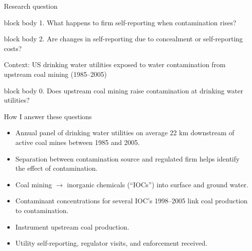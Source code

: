 \documentclass{beamer}
\begin{document}
\begin{frame}{Research question}

\begin{center}
\begin{beamercolorbox}[sep=10pt,center,rounded=true,shadow=true]{block body}
\large 1. What happens to firm self-reporting when contamination rises?
\end{beamercolorbox}
\end{center}

\begin{center}
\begin{beamercolorbox}[sep=10pt,center,rounded=true,shadow=true]{block body}
 2. Are changes in self-reporting due to concealment or self-reporting costs?
\end{beamercolorbox}
\end{center}

Context: US drinking water utilities exposed to water contamination from upstream coal mining (1985--2005)

\begin{center}
\begin{beamercolorbox}[sep=10pt,center,rounded=true,shadow=true]{block body}
 0. Does upstream coal mining raise contamination at drinking water utilities?
\end{beamercolorbox}
\end{center}

\end{frame}

\begin{frame}{How I answer these questions}

    \begin{itemize}
        \item Annual panel of drinking water utilities on average 22 km downstream of active coal mines between 1985 and 2005.
        \item Separation between contamination source and regulated firm helps identify the effect of contamination.

        \item Coal mining $\rightarrow$ inorganic chemicals (``IOCs'') into surface and ground water.
        \item Contaminant concentrations for several IOC's 1998--2005 link coal production to contamination.
        \item Instrument upstream coal production.
        \item Utility self-reporting, regulator visits, and enforcement received.
    \end{itemize}

\end{frame}
\end{document}
